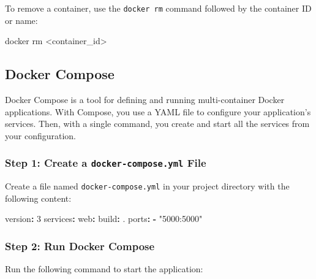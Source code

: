 \documentclass[
  letterpaper,
  DIV=11,
  numbers=noendperiod]{scrreprt}
\newenvironment{Shaded}{\begin{snugshade}}{\end{snugshade}}
\newcommand{\AttributeTok}[1]{\textcolor[rgb]{0.40,0.45,0.13}{#1}}
\newcommand{\ExtensionTok}[1]{\textcolor[rgb]{0.00,0.23,0.31}{#1}}
\newcommand{\FunctionTok}[1]{\textcolor[rgb]{0.28,0.35,0.67}{#1}}
\newcommand{\KeywordTok}[1]{\textcolor[rgb]{0.00,0.23,0.31}{\textbf{#1}}}
\newcommand{\NormalTok}[1]{\textcolor[rgb]{0.00,0.23,0.31}{#1}}
\newcommand{\OperatorTok}[1]{\textcolor[rgb]{0.37,0.37,0.37}{#1}}
\newcommand{\StringTok}[1]{\textcolor[rgb]{0.13,0.47,0.30}{#1}}
\begin{document}
To remove a container, use the \texttt{docker\ rm} command followed by
the container ID or name:

\begin{Shaded}
\begin{Highlighting}[]
\ExtensionTok{docker}\NormalTok{ rm }\OperatorTok{\textless{}}\NormalTok{container\_id}\OperatorTok{\textgreater{}}
\end{Highlighting}
\end{Shaded}

\subsection{Docker Compose}\label{docker-compose-1}

Docker Compose is a tool for defining and running multi-container Docker
applications. With Compose, you use a YAML file to configure your
application's services. Then, with a single command, you create and
start all the services from your configuration.

\subsubsection{\texorpdfstring{Step 1: Create a
\texttt{docker-compose.yml}
File}{Step 1: Create a docker-compose.yml File}}\label{step-1-create-a-docker-compose.yml-file-1}

Create a file named \texttt{docker-compose.yml} in your project
directory with the following content:

\begin{Shaded}
\begin{Highlighting}[]
\FunctionTok{version}\KeywordTok{:}\AttributeTok{ }\StringTok{\textquotesingle{}3\textquotesingle{}}
\FunctionTok{services}\KeywordTok{:}
\AttributeTok{  }\FunctionTok{web}\KeywordTok{:}
\AttributeTok{    }\FunctionTok{build}\KeywordTok{:}\AttributeTok{ .}
\AttributeTok{    }\FunctionTok{ports}\KeywordTok{:}
\AttributeTok{      }\KeywordTok{{-}}\AttributeTok{ }\StringTok{"5000:5000"}
\end{Highlighting}
\end{Shaded}

\subsubsection{Step 2: Run Docker
Compose}\label{step-2-run-docker-compose-1}

Run the following command to start the application:
\end{document}

